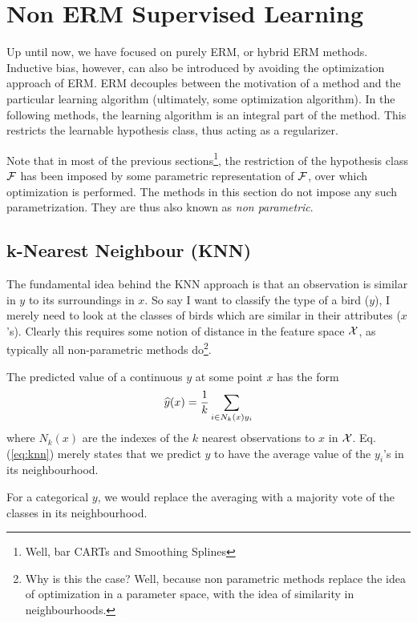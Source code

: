 \section{Non ERM Supervised Learning}
\label{sec:non_erm}
Up until now, we have focused on purely ERM, or hybrid ERM methods.
Inductive bias, however, can also be introduced by avoiding the optimization approach of ERM.
ERM decouples between the motivation of a method and the particular learning algorithm (ultimately, some optimization algorithm).
In the following methods, the learning algorithm is an integral part of the method. 
This restricts the learnable hypothesis class, thus acting as a regularizer.

Note that in most of the previous sections\footnote{Well, bar CARTs and Smoothing Splines}, the restriction of the hypothesis class $\mathcal{F}$ has been imposed by some parametric representation of $\mathcal{F}$, over which optimization is performed.
The methods in this section do not impose any such parametrization. They are thus also known as \emph{non parametric}.

 

\subsection{k-Nearest Neighbour (KNN)}
\label{sec:knn}
The fundamental idea behind the KNN approach is that an observation is similar in $y$ to its surroundings in $x$. 
So say I want to classify the type of a bird ($y$), I merely need to look at the classes of birds which are similar in their attributes ($x$'s). 
Clearly this requires some notion of distance in the feature space $\mathcal{X}$, as typically all non-parametric methods do\footnote{Why is this the case? Well, because non parametric methods replace the idea of optimization in a parameter space, with the idea of similarity in neighbourhoods.}.

The predicted value of a continuous $y$ at some point $x$ has the form
\begin{align}
\label{eq:knn}
	\widehat{y}(x)=\frac{1}{k}\sum_{i \in N_k(x) y_i}
\end{align}
where $N_k(x)$ are the indexes of the $k$ nearest observations to $x$ in $\mathcal{X}$.
Eq.(\ref{eq:knn}) merely states that we predict $y$ to have the average value of the $y_i$'s in its neighbourhood.

For a categorical $y$, we would replace the averaging with a majority vote of the classes in its neighbourhood.

